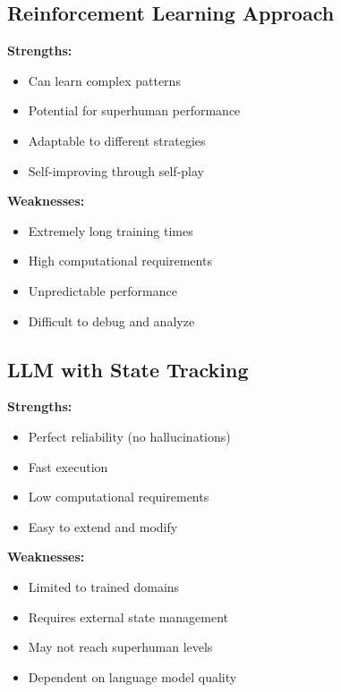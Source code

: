 \documentclass[11pt,a4paper]{report}
\begin{document}
\subsection{Reinforcement Learning Approach}
\begin{singlespace}
\textbf{Strengths:}
\begin{itemize}
    \item Can learn complex patterns
    \item Potential for superhuman performance
    \item Adaptable to different strategies
    \item Self-improving through self-play
\end{itemize}

\textbf{Weaknesses:}
\begin{itemize}
    \item Extremely long training times
    \item High computational requirements
    \item Unpredictable performance
    \item Difficult to debug and analyze
\end{itemize}
\end{singlespace}

\subsection{LLM with State Tracking}
\begin{singlespace}
\textbf{Strengths:}
\begin{itemize}
    \item Perfect reliability (no hallucinations)
    \item Fast execution
    \item Low computational requirements
    \item Easy to extend and modify
\end{itemize}

\textbf{Weaknesses:}
\begin{itemize}
    \item Limited to trained domains
    \item Requires external state management
    \item May not reach superhuman levels
    \item Dependent on language model quality
\end{itemize}
\end{singlespace}
\end{document}
